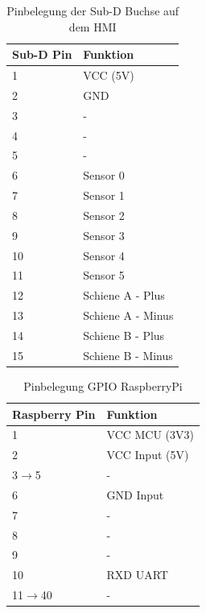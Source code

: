 \documentclass[a4paper, 11pt]{report}
\begin{document}
	\begin{table}[H]
	\centering
		\caption{Pinbelegung der Sub-D Buchse auf dem HMI}
		\begin{tabular}{|l|l|}
			\hline
			\textbf{Sub-D Pin} &\textbf{Funktion}\\
			\hline
			\hline
			1 & VCC (5V)\\
			\hline
			2 & GND\\
			\hline
			3 & -\\
			\hline
			4 & -\\
			\hline
			5 & -\\
			\hline
			6 & Sensor 0\\
			\hline
			7 & Sensor 1\\
			\hline
			8 & Sensor 2\\
			\hline
			9 & Sensor 3\\
			\hline
			10 & Sensor 4\\
			\hline
			11 & Sensor 5\\
			\hline
			12 & Schiene A - Plus\\
			\hline
			13 & Schiene A - Minus\\
			\hline
			14 & Schiene B - Plus\\
			\hline
			15 & Schiene B - Minus\\
			\hline
		\end{tabular}
		\label{tab:AnhangBelegungSUBD}
	\end{table}

	\begin{table}[H]
	\centering
		\caption{Pinbelegung GPIO RaspberryPi}
		\begin{tabular}{|l|l|}
			\hline
			\textbf{Raspberry Pin} &\textbf{Funktion}\\
			\hline
			\hline
			1 & VCC MCU (3V3)\\
			\hline
			2 & VCC Input (5V)\\
			\hline
			3$\rightarrow$5 & -\\
			\hline
			6 & GND Input\\
			\hline
			7 & -\\
			\hline
			8 & -\\
			\hline
			9 & -\\
			\hline
			10 & RXD UART\\
			\hline
			11$\rightarrow$40 & -\\
			\hline
		\end{tabular}
		
		\label{tab:AnhangBelegungRPI}
	\end{table}
\end{document}
